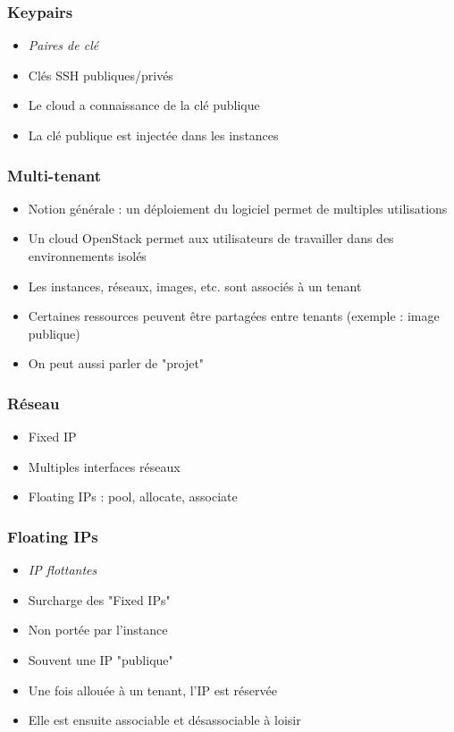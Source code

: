   \begin{frame}
    \frametitle{Keypairs}
    \begin{itemize}
      \item \textit{Paires de clé}
      \item Clés SSH publiques/privés
      \item Le cloud a connaissance de la clé publique
      \item La clé publique est injectée dans les instances
    \end{itemize}
  \end{frame}

  \begin{frame}
    \frametitle{Multi-tenant}
    \begin{itemize}
      \item Notion générale : un déploiement du logiciel permet de multiples utilisations
      \item Un cloud OpenStack permet aux utilisateurs de travailler dans des environnements isolés
      \item Les instances, réseaux, images, etc. sont associés à un tenant
      \item Certaines ressources peuvent être partagées entre tenants (exemple : image publique)
      \item On peut aussi parler de "projet"
    \end{itemize}
  \end{frame}

  \begin{frame}
    \frametitle{Réseau}
    \begin{itemize}
      \item Fixed IP
      \item Multiples interfaces réseaux
      \item Floating IPs : pool, allocate, associate
    \end{itemize}
  \end{frame}

  \begin{frame}
    \frametitle{Floating IPs}
    \begin{itemize}
      \item \textit{IP flottantes}
      \item Surcharge des "Fixed IPs"
      \item Non portée par l'instance
      \item Souvent une IP "publique"
      \item Une fois allouée à un tenant, l'IP est réservée
      \item Elle est ensuite associable et désassociable à loisir
    \end{itemize}
  \end{frame}

